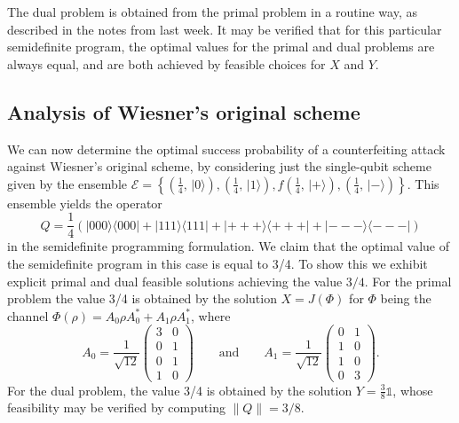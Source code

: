 \documentclass[11pt, letterpaper]{article}
\theoremstyle{remark}
\theoremstyle{definition}
\numberwithin{equation}{section}
\newcommand{\1}{\mathbb{1}}
\newcommand{\norm}[1]{\left\lVert#1\right\rVert}
\def\I{\mathds{1}}
\newcommand{\ket}[1]{|#1\rangle}
\newcommand{\bra}[1]{\langle#1|}
\begin{document}
The dual problem is obtained from the primal problem in a routine way,
as described in the notes from last week. 
It may be verified that for this particular semidefinite program, the
optimal values for the primal and dual problems are always equal, and
are both achieved by feasible choices for $X$ and $Y$.

\subsection{Analysis of Wiesner's original scheme}

We can now determine the optimal success probability of a
counterfeiting attack against Wiesner's original scheme, by
considering just the single-qubit scheme given by the ensemble 
$\mathcal{E} = 
\left\{
\left(\frac{1}{4}, \, \ket{0}\right),
\left(\frac{1}{4}, \, \ket{1}\right),f
\left(\frac{1}{4}, \, \ket{+}\right),
\left(\frac{1}{4}, \, \ket{-}\right)
\right\}$.
This ensemble yields the operator 
\[
Q =  
\frac{1}{4} \left( \ket{000} \bra{000} + \ket{111}\bra{111} +  
\ket{+++} \bra{+++}  + \ket{---} \bra{---}   \right)
\]
in the semidefinite programming formulation.
We claim that the optimal value of the semidefinite program in this
case is equal to 3/4. To
show this we exhibit explicit primal and dual feasible
solutions achieving the value $3/4$. For the primal problem
 the value 3/4 is obtained by the solution
$X = J(\Phi)$ for $\Phi$ being the channel
\setlength{\arraycolsep}{4pt}
$\Phi(\rho) = A_0 \rho A_0^{\ast} + A_1 \rho A_1^{\ast}$, where
\[
A_0 = \frac{1}{\sqrt{12}}
\begin{pmatrix} 3 & 0 \\ 0 & 1 \\  0 & 1 \\ 1 & 0 \end{pmatrix}
\qquad\text{and}\qquad
A_1 =  \frac{1}{\sqrt{12}}
\begin{pmatrix} 0 & 1 \\ 1 & 0 \\  1 & 0 \\ 0 & 3 \end{pmatrix}.
\]
For the dual problem, the value 3/4 is obtained by the solution
$Y = \frac{3}{8}\I$, whose feasibility may be verified by computing
$\norm{Q} = 3/8$.
\end{document}
